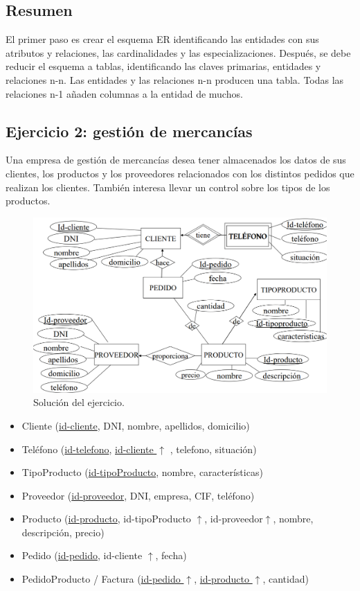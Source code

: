 \subsection{Resumen}
El primer paso es crear el esquema ER identificando las entidades con sus atributos y relaciones, las cardinalidades y las especializaciones. Después, se debe reducir el esquema a tablas, identificando las claves primarias, entidades y relaciones n-n. Las entidades y las relaciones n-n producen una tabla. Todas las relaciones n-1 añaden columnas a la entidad de muchos.

\subsection{Ejercicio 2: gestión de mercancías}
Una empresa de gestión de mercancías desea tener almacenados los datos de sus clientes, los productos y los proveedores relacionados con los distintos pedidos que realizan los clientes. También interesa llevar un control sobre los tipos de los productos.

\begin{figure}[htbp]
\centering
\includegraphics[width=0.7\linewidth]{figs/ejercicio-2-solucion.png}
\caption{Solución del ejercicio.}
\end{figure}

\begin{itemize}
\item Cliente (\underline{id-cliente}, DNI, nombre, apellidos, domicilio)
\item Teléfono (\underline{id-telefono}, \underline{id-cliente $\uparrow$} , telefono, situación)
\item TipoProducto (\underline{id-tipoProducto}, nombre, características)
\item Proveedor (\underline{id-proveedor}, DNI, empresa, CIF, teléfono)
\item Producto (\underline{id-producto}, id-tipoProducto $\uparrow$, id-proveedor$ \uparrow$, nombre, descripción, precio)
\item Pedido (\underline{id-pedido}, id-cliente $\uparrow$, fecha)
\item PedidoProducto / Factura (\underline{id-pedido $\uparrow$}, \underline{id-producto $\uparrow$}, cantidad) 
\end{itemize}

